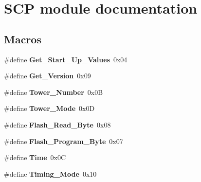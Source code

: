 \hypertarget{group___s_c_p__module}{}\section{S\+C\+P module documentation}
\label{group___s_c_p__module}
\subsection*{Macros}
\begin{DoxyCompactItemize}
\item 
\hypertarget{group___s_c_p__module_ga9580c54a77113586428691a51e58bc13}{}\#define {\bfseries Get\+\_\+\+Start\+\_\+\+Up\+\_\+\+Values}~0x04\label{group___s_c_p__module_ga9580c54a77113586428691a51e58bc13}

\item 
\hypertarget{group___s_c_p__module_gada81cbe0d982ed38b2dd9939eb1f245e}{}\#define {\bfseries Get\+\_\+\+Version}~0x09\label{group___s_c_p__module_gada81cbe0d982ed38b2dd9939eb1f245e}

\item 
\hypertarget{group___s_c_p__module_ga1f409a2cb870fcfff3924ad37d126376}{}\#define {\bfseries Tower\+\_\+\+Number}~0x0\+B\label{group___s_c_p__module_ga1f409a2cb870fcfff3924ad37d126376}

\item 
\hypertarget{group___s_c_p__module_gac653df0f2f6f61d516dc4afd2d911619}{}\#define {\bfseries Tower\+\_\+\+Mode}~0x0\+D\label{group___s_c_p__module_gac653df0f2f6f61d516dc4afd2d911619}

\item 
\hypertarget{group___s_c_p__module_ga33b1d1578163d60356da3a7e8aca1ca3}{}\#define {\bfseries Flash\+\_\+\+Read\+\_\+\+Byte}~0x08\label{group___s_c_p__module_ga33b1d1578163d60356da3a7e8aca1ca3}

\item 
\hypertarget{group___s_c_p__module_ga33f1f48497708eb145c9fb3e66f054ec}{}\#define {\bfseries Flash\+\_\+\+Program\+\_\+\+Byte}~0x07\label{group___s_c_p__module_ga33f1f48497708eb145c9fb3e66f054ec}

\item 
\hypertarget{group___s_c_p__module_gaec5039d66182749e977fb4fee3090d83}{}\#define {\bfseries Time}~0x0\+C\label{group___s_c_p__module_gaec5039d66182749e977fb4fee3090d83}

\item 
\hypertarget{group___s_c_p__module_gaf9684ac38f1c2917034bd8e112857fcb}{}\#define {\bfseries Timing\+\_\+\+Mode}~0x10\label{group___s_c_p__module_gaf9684ac38f1c2917034bd8e112857fcb}


\end{DoxyCompactItemize}
